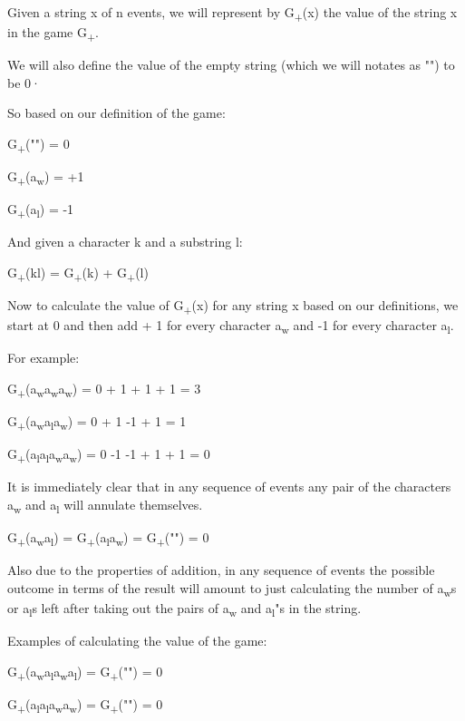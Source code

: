 \documentclass[12pt,reqno]{amsart}
\begin{document}
Given a string x of n events, we will represent by G\textsubscript{+}(x) the value of the string x in the game G\textsubscript{+}.

We will also define the value of the empty string (which we will notates as "") to be 0·

So based on our definition of the game:

G\textsubscript{+}("") = 0

G\textsubscript{+}(a\textsubscript{w}) = +1

G\textsubscript{+}(a\textsubscript{l}) = -1

And given a character k and a substring l:

G\textsubscript{+}(kl) = G\textsubscript{+}(k) + G\textsubscript{+}(l)

Now to calculate the value of G\textsubscript{+}(x) for any string x based on our definitions, we start at 0 and then add + 1 for every character a\textsubscript{w} and -1 for every character a\textsubscript{l}.

For example:

G\textsubscript{+}(a\textsubscript{w}a\textsubscript{w}a\textsubscript{w}) = 0 + 1 + 1 + 1 = 3

G\textsubscript{+}(a\textsubscript{w}a\textsubscript{l}a\textsubscript{w}) = 0 + 1 -1 + 1 = 1

G\textsubscript{+}(a\textsubscript{l}a\textsubscript{l}a\textsubscript{w}a\textsubscript{w}) = 0 -1 -1 + 1 + 1 = 0


It is immediately clear that in any sequence of events any pair of the characters a\textsubscript{w} and a\textsubscript{l} will annulate themselves. 

G\textsubscript{+}(a\textsubscript{w}a\textsubscript{l}) = G\textsubscript{+}(a\textsubscript{l}a\textsubscript{w}) = G\textsubscript{+}("") = 0


Also due to the properties of addition, in any sequence of events the possible outcome in terms of the result will amount to just calculating the number of a\textsubscript{w}s or a\textsubscript{l}s left after taking out the pairs of a\textsubscript{w} and a\textsubscript{l}"s in the string.

Examples of calculating the value of the game: 

G\textsubscript{+}(a\textsubscript{w}a\textsubscript{l}a\textsubscript{w}a\textsubscript{l}) = G\textsubscript{+}("") = 0

G\textsubscript{+}(a\textsubscript{l}a\textsubscript{l}a\textsubscript{w}a\textsubscript{w}) = G\textsubscript{+}("") = 0
\end{document}
